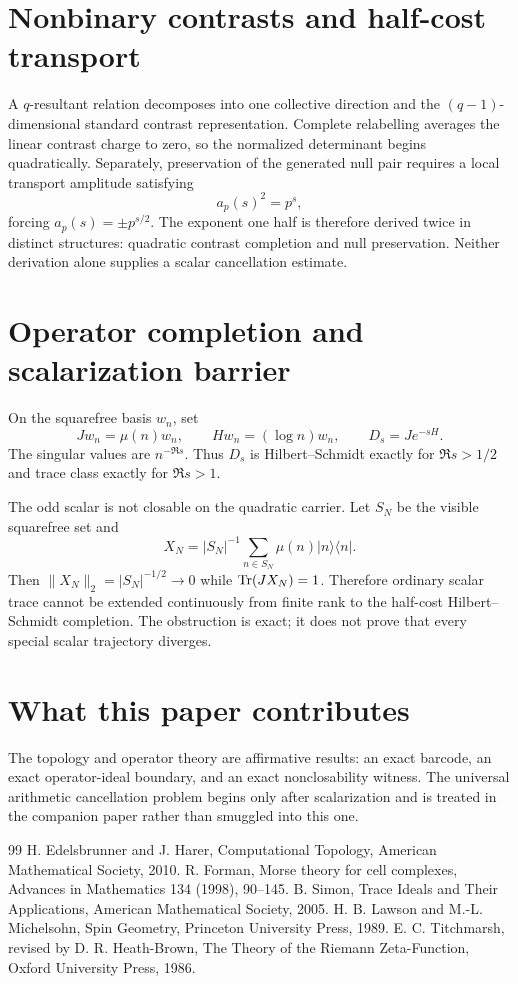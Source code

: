 \documentclass[11pt,a4paper]{article}
\begin{document}
\section{Nonbinary contrasts and half-cost transport}
A $q$-resultant relation decomposes into one collective direction and the $(q-1)$-dimensional standard contrast representation. Complete relabelling averages the linear contrast charge to zero, so the normalized determinant begins quadratically. Separately, preservation of the generated null pair requires a local transport amplitude satisfying
\begin{equation}
a_p(s)^2=p^s,
\end{equation}
forcing $a_p(s)=\pm p^{s/2}$. The exponent one half is therefore derived twice in distinct structures: quadratic contrast completion and null preservation. Neither derivation alone supplies a scalar cancellation estimate.

\section{Operator completion and scalarization barrier}
On the squarefree basis $w_n$, set
\begin{equation}
Jw_n=\mu(n)w_n,\qquad Hw_n=(\log n)w_n,\qquad D_s=Je^{-sH}.
\end{equation}
The singular values are $n^{-\Re s}$. Thus $D_s$ is Hilbert--Schmidt exactly for $\Re s>1/2$ and trace class exactly for $\Re s>1$.

The odd scalar is not closable on the quadratic carrier. Let $S_N$ be the visible squarefree set and
\begin{equation}
X_N=|S_N|^{-1}\sum_{n\in S_N}\mu(n)|n\rangle\langle n|.
\end{equation}
Then $\|X_N\|_2=|S_N|^{-1/2}\to0$ while $\operatorname{Tr}(JX_N)=1$. Therefore ordinary scalar trace cannot be extended continuously from finite rank to the half-cost Hilbert--Schmidt completion. The obstruction is exact; it does not prove that every special scalar trajectory diverges.

\section{What this paper contributes}
The topology and operator theory are affirmative results: an exact barcode, an exact operator-ideal boundary, and an exact nonclosability witness. The universal arithmetic cancellation problem begins only after scalarization and is treated in the companion paper rather than smuggled into this one.

\begin{thebibliography}{99}
 H. Edelsbrunner and J. Harer, Computational Topology, American Mathematical Society, 2010.
 R. Forman, Morse theory for cell complexes, Advances in Mathematics 134 (1998), 90--145.
 B. Simon, Trace Ideals and Their Applications, American Mathematical Society, 2005.
 H. B. Lawson and M.-L. Michelsohn, Spin Geometry, Princeton University Press, 1989.
 E. C. Titchmarsh, revised by D. R. Heath-Brown, The Theory of the Riemann Zeta-Function, Oxford University Press, 1986.
\end{thebibliography}
\end{document}
